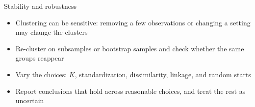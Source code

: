 %

\begin{frame}{Stability and robustness}
    \begin{itemize}
        \item Clustering can be sensitive: removing a few observations or changing a setting may change the clusters
        \item Re-cluster on subsamples or bootstrap samples and check whether the same groups reappear%
        \item Vary the choices: $K$, standardization, dissimilarity, linkage, and random starts
        \item Report conclusions that hold across reasonable choices, and treat the rest as uncertain
    \end{itemize}
\end{frame}

